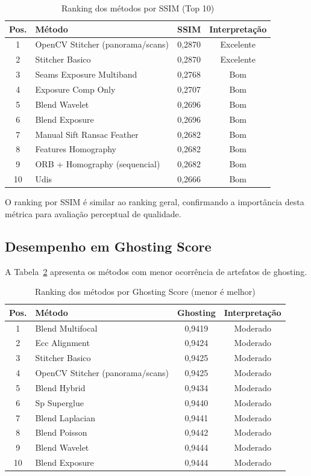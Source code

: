 \begin{table}[htb]
\centering
\caption{Ranking dos métodos por SSIM (Top 10)}
\label{tab:ssim-ranking}
\small
\begin{tabular}{clcc}
\hline
\textbf{Pos.} & \textbf{Método} & \textbf{SSIM} & \textbf{Interpretação} \\ \hline
1 & OpenCV Stitcher (panorama/scans) & 0,2870 & Excelente \\
2 & Stitcher Basico & 0,2870 & Excelente \\
3 & Seams Exposure Multiband & 0,2768 & Bom \\
4 & Exposure Comp Only & 0,2707 & Bom \\
5 & Blend Wavelet & 0,2696 & Bom \\
6 & Blend Exposure & 0,2696 & Bom \\
7 & Manual Sift Ransac Feather & 0,2682 & Bom \\
8 & Features Homography & 0,2682 & Bom \\
9 & ORB + Homography (sequencial) & 0,2682 & Bom \\
10 & Udis & 0,2666 & Bom \\
\hline
\end{tabular}
\end{table}

O ranking por SSIM é similar ao ranking geral, confirmando a importância desta métrica para avaliação perceptual de qualidade.

\subsection{Desempenho em Ghosting Score}

A Tabela~\ref{tab:ghosting-ranking} apresenta os métodos com menor ocorrência de artefatos de ghosting.

\begin{table}[htb]
\centering
\caption{Ranking dos métodos por Ghosting Score (menor é melhor)}
\label{tab:ghosting-ranking}
\small
\begin{tabular}{clcc}
\hline
\textbf{Pos.} & \textbf{Método} & \textbf{Ghosting} & \textbf{Interpretação} \\ \hline
1 & Blend Multifocal & 0,9419 & Moderado \\
2 & Ecc Alignment & 0,9424 & Moderado \\
3 & Stitcher Basico & 0,9425 & Moderado \\
4 & OpenCV Stitcher (panorama/scans) & 0,9425 & Moderado \\
5 & Blend Hybrid & 0,9434 & Moderado \\
6 & Sp Superglue & 0,9440 & Moderado \\
7 & Blend Laplacian & 0,9441 & Moderado \\
8 & Blend Poisson & 0,9442 & Moderado \\
9 & Blend Wavelet & 0,9444 & Moderado \\
10 & Blend Exposure & 0,9444 & Moderado \\
\hline
\end{tabular}
\end{table}

